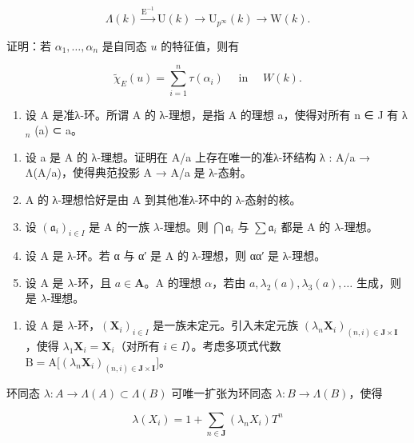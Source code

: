 \[
\Lambda (k) \xrightarrow {\mathrm{E} ^ {- 1}} \mathrm{U} (k) \longrightarrow \mathrm{U} _ {p ^ {\infty}} (k) \longrightarrow \mathrm{W} (k).
\]

证明：若 \(\alpha_{1},\ldots,\alpha_{n}\) 是自同态 \(u\) 的特征值，则有

\[
\tilde {\chi} _ {E} (u) = \sum_ {i = 1} ^ {n} \tau (\alpha_ {i}) \quad \text { in } \quad W (k).
\]

\begin{enumerate}
\def\labelenumi{\arabic{enumi})}
\setcounter{enumi}{49}
\tightlist
\item
  设 A 是准λ-环。所谓 A 的 λ-理想，是指 A 的理想 a，使得对所有 n ∈ J 有 λ \(_{n}\) (a) ⊂ a。
\end{enumerate}

\begin{enumerate}
\def\labelenumi{\alph{enumi})}
\item
  设 a 是 A 的 λ-理想。证明在 A/a 上存在唯一的准λ-环结构 λ : A/a → Λ(A/a)，使得典范投影 A → A/a 是 λ-态射。
\item
  A 的 λ-理想恰好是由 A 到其他准λ-环中的 λ-态射的核。
\item
  设 \((\mathfrak{a}_i)_{i\in I}\) 是 A 的一族 \(\lambda\)-理想。则 \(\bigcap \mathfrak{a}_i\) 与 \(\sum \mathfrak{a}_i\) 都是 A 的 \(\lambda\)-理想。
\item
  设 A 是 λ-环。若 α 与 α′ 是 A 的 λ-理想，则 αα′ 是 λ-理想。
\item
  设 A 是 \(\lambda\)-环，且 \(a \in \mathbf{A}\)。A 的理想 \(\alpha\)，若由 \(a, \lambda_2(a), \lambda_3(a), \ldots\) 生成，则是 \(\lambda\)-理想。
\end{enumerate}

\begin{enumerate}
\def\labelenumi{\arabic{enumi})}
\setcounter{enumi}{50}
\tightlist
\item
  设 A 是 \(\lambda\)-环，\((\mathbf{X}_i)_{i\in I}\) 是一族未定元。引入未定元族 \((\lambda_n\mathbf{X}_i)_{(n,i)\in \mathbf{J}\times \mathbf{I}}\)，使得 \(\lambda_1\mathbf{X}_i = \mathbf{X}_i\)（对所有 \(i\in I\)）。考虑多项式代数 \(\mathrm{B} = \mathrm{A}\big[(\lambda_n\mathbf{X}_i)_{(n,i)\in \mathbf{J}\times \mathbf{I}}\big]\)。
\end{enumerate}

环同态 \(\lambda: A \to \Lambda(A) \subset \Lambda(B)\) 可唯一扩张为环同态 \(\lambda: B \to \Lambda(B)\)，使得

\[
\lambda (X _ {i}) = 1 + \sum_ {n \in \mathbf {J}} (\lambda_ {n} X _ {i}) T ^ {n}
\]


